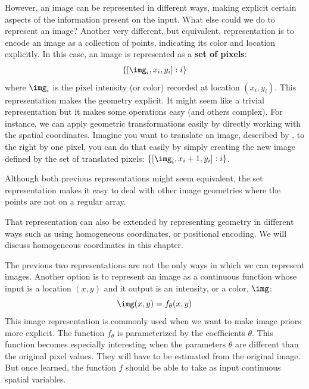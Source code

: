 However, an image can be represented in different ways, making explicit certain aspects of the information present on the input. What else could we do to represent an image? Another very different, but equivalent, representation is to encode an image as a collection of points, indicating its color and location explicitly. In this case, an image is represented as a {\bf set of pixels}:
\begin{equation}
\left\{ [\img_i,x_i,y_i] : i \right\}
\label{eq:set_of_pixels}
\end{equation}
 where $\img_i$ is the pixel intensity (or color) recorded at location $(x_i,y_i)$. 
 This representation makes the geometry explicit. It might seem like a trivial representation but it makes some operations easy (and others complex). For instance, we can apply geometric transformations easily by directly working with the spatial coordinates. Imagine you want to translate an image, described by \eqn{\ref{eq:set_of_pixels}}, to the right by one pixel, you can do that easily by simply creating the new image defined by the set of translated pixels: $\left\{ [\img_i,x_i+1,y_i] : i \right\}$. 

 
 Although both previous representations might seem equivalent, the set representation makes it easy to deal with other image geometries where the points are not on a regular array. 
 
 That representation can also be extended by representing geometry in different ways such as using homogeneous coordinates, or positional encoding. We will discuss homogeneous coordinates in this chapter. 

The previous two representations are not the only ways in which we can represent images. Another option is to represent an image as a continuous function whose input is
a location $(x, y)$ and it output is an intensity, or a color, $\img$:
\begin{equation}
   \img (x,y) = f_{\theta}(x,y)
\end{equation}
This image representation is commonly used when we want to make image priors more explicit. The function $f_{\theta}$ is parameterized by the coefficients $\theta$. This function becomes especially interesting when the parameters $\theta$ are different than the original pixel values. They will have to be estimated from the original image. But once learned, the function $f$ should be able to take as input continuous spatial variables.

